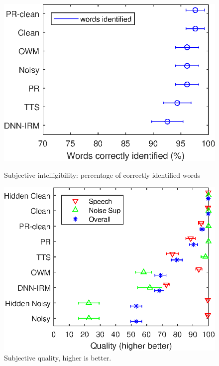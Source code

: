 \documentclass{article}
\begin{document}
\begin{figure}[tb]
\begin{minipage}[b]{0.95\linewidth}
  \centering
  \centerline{\includegraphics[width=.75\linewidth, trim={0 0.6cm
0 0},clip]{00-intel.eps}}
  \caption{Subjective intelligibility: percentage of correctly identified words}
 \label{fig:intel}
\vspace{0.4cm}
\end{minipage}
\begin{minipage}[b]{0.95\linewidth}
  \centering
  \centerline{\includegraphics[width=.8\linewidth,  trim={0 0.61cm
0.4 0},clip]{01-qual.eps}}
  \caption{Subjective quality, higher is better.}
  \label{fig:qual}
\end{minipage}
\end{figure}
\end{document}
